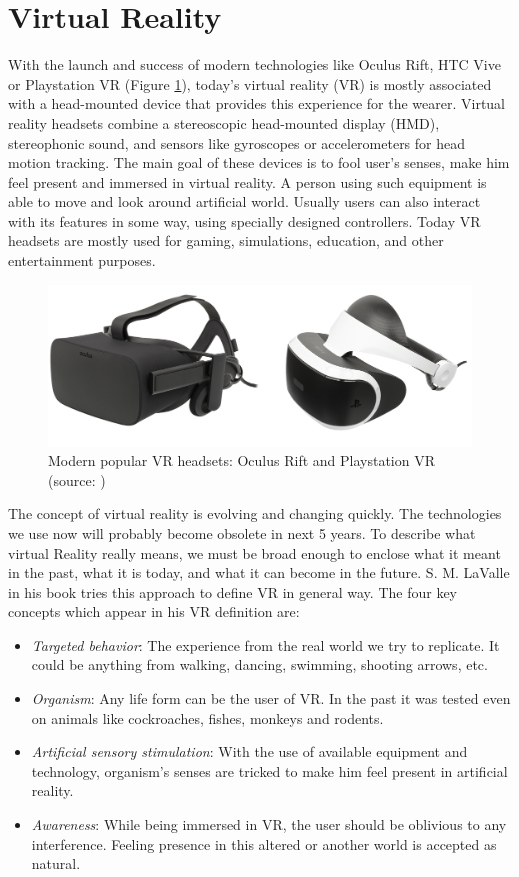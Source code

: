 \section{Virtual Reality}
With the launch and success of modern technologies like Oculus Rift, HTC Vive or Playstation VR (Figure \ref{fig:CONTROLLERS}), today’s virtual reality (VR) is mostly associated with a head-mounted device that provides this experience for the wearer. Virtual reality headsets combine a stereoscopic head-mounted display (HMD), stereophonic sound, and sensors like gyroscopes or accelerometers for head motion tracking. The main goal of these devices is to fool user’s senses, make him feel present and immersed in virtual reality. A person using such equipment is able to move and look around artificial world. Usually users can also interact with its features in some way, using specially designed controllers. Today VR headsets are mostly used for gaming, simulations, education, and other entertainment purposes.

\begin{figure}[th]
\centering
\includegraphics[width=1\textwidth]{img/headsets.png}
\caption{Modern popular VR headsets: Oculus Rift and Playstation VR (source: \cite{OCULUS_HEADSET}\cite{PSVR_HEADSET})}
\label{fig:CONTROLLERS}
\end{figure}

The concept of virtual reality is evolving and changing quickly. The technologies we use now will probably become obsolete in next 5 years. To describe what virtual Reality really means, we must be broad enough to enclose what it meant in the past, what it is today, and what it can become in the future. S. M. LaValle in his book \cite{VR_BOOK} tries this approach to define VR in general way. The four key concepts which appear in his VR definition are:

\begin{itemize}
\item \textit{Targeted behavior}: The experience from the real world we try to replicate. It could be anything from walking, dancing, swimming, shooting arrows, etc.
\item \textit{Organism}: Any life form can be the user of VR. In the past it was tested even on animals like cockroaches, fishes, monkeys and rodents.
\item \textit{Artificial sensory stimulation}: With the use of available equipment and technology, organism’s senses are tricked to make him feel present in artificial reality.
\item \textit{Awareness}: While being immersed in VR, the user should be oblivious to any interference. Feeling presence in this altered or another world is accepted as natural.
\end{itemize}

